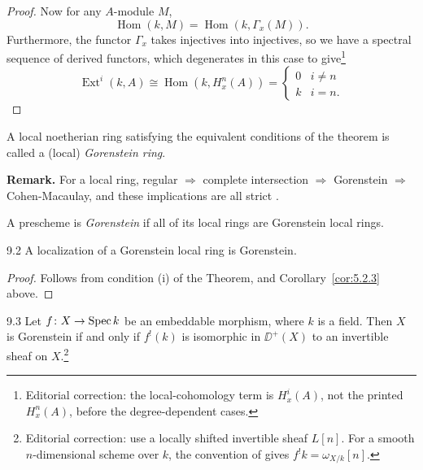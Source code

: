 \begin{proof}
Now for any $A$-module $M$,
\[
\operatorname{Hom}(k,M) = \operatorname{Hom}(k, \Gamma_{x}(M)).
\]
Furthermore, the functor $\Gamma_{x}$ takes injectives into injectives, so we have a spectral sequence of derived functors, which degenerates in this case to give\footnote{Editorial correction: the local-cohomology term is $H_x^i(A)$, not the printed $H_x^n(A)$, before the degree-dependent cases.}
\[
\operatorname{Ext}^{i}(k,A) \cong \operatorname{Hom}(k, H_{x}^{n}(A)) = \begin{cases} 0 & i\neq n \\ k & i = n. \end{cases}
\]
\end{proof}

\begin{definition*}
A local noetherian ring satisfying the equivalent conditions of the theorem is called a (local) \emph{Gorenstein ring}.
\end{definition*}

\par\medskip\noindent\textbf{Remark.}
For a local ring, regular $\Longrightarrow$ complete intersection $\Longrightarrow$ Gorenstein $\Longrightarrow$ Cohen-Macaulay, and these implications are all strict \cite{2}.
\par\medskip

\begin{definition*}
A prescheme is \emph{Gorenstein} if all of its local rings are Gorenstein local rings.
\end{definition*}

\begin{bookcorollary}{9.2}\label{cor:5.9.2}
A localization of a Gorenstein local ring is Gorenstein.
\end{bookcorollary}

\begin{proof}
Follows from condition (i) of the Theorem, and Corollary~\ref{cor:5.2.3} above.
\end{proof}

\begin{bookproposition}{9.3}\label{prop:5.9.3}
Let $f\colon X\to\operatorname{Spec} k$ be an embeddable morphism, where $k$ is a field. Then $X$ is Gorenstein if and only if $f^{!}(k)$ is isomorphic in $\DD^+(X)$ to an invertible sheaf on $X$.\footnote{Editorial correction: use a locally shifted invertible sheaf $L[n]$. For a smooth $n$-dimensional scheme over $k$, the convention of  gives $f^!k=\omega_{X/k}[n]$.}
\end{bookproposition}


